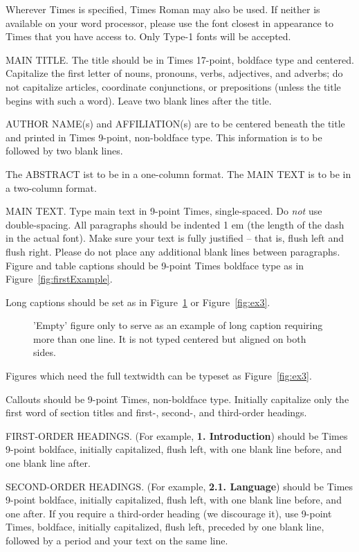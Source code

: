 \documentclass{egpubl}
\begin{document}
	Wherever Times is specified, Times Roman may also be used. If
	neither is available on your word processor, please use the font
	closest in appearance to Times that you have access to. Only
	Type-1 fonts will be accepted.
	
	MAIN TITLE. The title should be in Times 17-point, boldface type and
	centered. Capitalize the first letter of nouns, pronouns, verbs, adjectives,
	and adverbs; do not capitalize articles, coordinate conjunctions, or
	prepositions (unless the title begins with such a word). Leave two blank
	lines after the title.
	
	AUTHOR NAME(s) and AFFILIATION(s) are to be centered beneath the title and
	printed in Times 9-point, non-boldface type. This information is to be
	followed by two blank lines.
	
	The ABSTRACT ist to be in a one-column format. The MAIN TEXT is to be in a
	two-column format.
	
	MAIN TEXT. Type main text in 9-point Times, single-spaced. Do \emph{not} use
	double-spacing. All paragraphs should be indented 1 em (the length of the
	dash in the actual font). Make sure your text is fully justified -- that is,
	flush left and flush right. Please do not place any additional blank lines
	between paragraphs. Figure and table captions should be 9-point Times
	boldface type as in Figure~\ref{fig:firstExample}.
	
	\noindent Long captions should be set as in Figure~\ref{fig:ex1} or
	Figure~\ref{fig:ex3}.
	
	\begin{figure}[htb]
		\caption{\label{fig:ex1}
			'Empty' figure only to serve as an example of long caption requiring 
			more than one line. It is not typed centered but aligned on both sides.}
	\end{figure}
	
	\noindent
	Figures which need the full textwidth can be typeset as Figure~\ref{fig:ex3}.
	
	\noindent Callouts should be 9-point Times, non-boldface type. Initially
	capitalize only the first word of section titles and first-, second-, and
	third-order headings.
	
	FIRST-ORDER HEADINGS. (For example, \textbf{1. Introduction}) should be Times
	9-point boldface, initially capitalized, flush left, with one blank line
	before, and one blank line after.
	
	SECOND-ORDER HEADINGS. (For example, \textbf{2.1. Language}) should be Times
	9-point boldface, initially capitalized, flush left, with one blank line
	before, and one after. If you require a third-order heading (we discourage
	it), use 9-point Times, boldface, initially capitalized, flush left, preceded
	by one blank line, followed by a period and your text on the same line.
	
\end{document}
